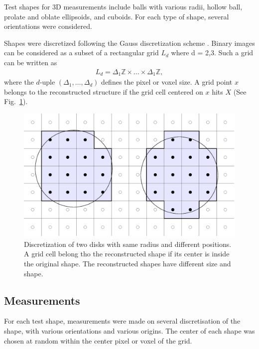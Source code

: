 \documentclass{InsightArticle}
\begin{document}
Test shapes for 3D measurements include
balls with various radii, hollow ball, prolate and oblate ellipsoids, and cuboids. 
For each type of shape, several orientations were considered.

Shapes were discretized following the Gauss discretization scheme \cite{Klette2004, Legland2007}.
Binary images can be considered as a subset of a rectangular grid $L_d$ where
d = 2,3. Such a grid can be written as
\begin{eqnarray}
L_d = \Delta_{1} \mathbb{Z} \times \ldots \times \Delta_{1} \mathbb{Z},
\end{eqnarray}
where the $d$-uple $(\Delta_{1},\ldots,\Delta_{d})$ defines the pixel
or voxel size. 
A grid point $x$ belongs to the reconstructed structure if the grid
cell centered on $x$ hits $X$ (See Fig.~\ref{fig:DiskDiscretization}).

\begin{figure}[!htb]
\begin{center}
\includegraphics[width=12cm]{images/discreteDisks2}
\end{center}
\caption{Discretization of two disks with same radius and different positions. 
A grid cell belong tho the reconstructed shape if its center is inside the original shape.
The reconstructed shapes have different size and shape.}
\label{fig:DiskDiscretization}
\end{figure}


\subsection{Measurements}

For each test shape, measurements were made on
several discretisation of the shape, with various orientations and various origins.
The center of each shape was chosen at random within the center pixel or voxel of the grid.
\end{document}
